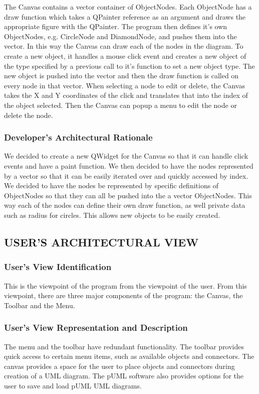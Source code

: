 \documentclass[twoside,letterpaper]{article}
\begin{document}
{{
The Canvas contains a vector container of
ObjectNodes. Each ObjectNode has a draw function which takes a QPainter
reference as an argument and draws the appropriate figure with the
QPainter. The program then defines it's own ObjectNodes, e.g. CircleNode
and DiamondNode, and pushes them into the vector. In this way the Canvas
can draw each of the nodes in the diagram. To create a new object, it
handles a mouse click event and creates a new object of the type specified
by a previous call to it's function to set a new object type. The new
object is pushed into the vector and then the draw function is called
on every node in that vector. When selecting a node to edit or delete,
the Canvas takes the X and Y coordinates of the click and translates that
into the index of the object selected. Then the Canvas can popup a menu
to edit the node or delete the node. }


\subsubsection{Developer{\textquoteright}s Architectural Rationale}

{
We decided to create a new QWidget for the Canvas so that it can handle
click events and have a paint function. We then decided to have the nodes
represented by a vector so that it can be easily iterated over and quickly
accessed by index. We decided to have the nodes be represented by specific
definitions of ObjectNodes so that they can all be pushed into the a vector
ObjectNodes. This way each of the nodes can define their own draw function,
as well private data such as radius for circles. This allows new objects to
be easily created. }

\clearpage
\subsection[USER{\textquoteright}S ARCHITECTURAL VIEW]
{\bfseries USER{\textquoteright}S ARCHITECTURAL VIEW}

\subsubsection{User{\textquoteright}s View Identification}
{
This is the viewpoint of the program from the viewpoint of the user.
From this viewpoint, there are three major components of the
program: the Canvas, the Toolbar and the Menu. }

\subsubsection{User{\textquoteright}s View Representation and
Description }
{
The menu and the toolbar have redundant functionality. The toolbar provides
quick access to certain menu items, such as available objects and connectors. The canvas provides a space for the user to place objects and connectors during creation of a UML diagram. The pUML software also provides options for the user to save and load pUML UML diagrams. 
}

}
\end{document}
